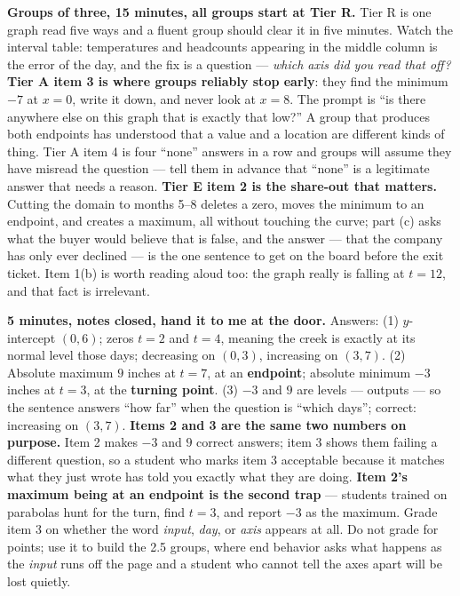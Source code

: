 \documentclass[10pt]{article}
\begin{document}
\boxguard[18]
\begin{teachernote}
    \textbf{Groups of three, 15 minutes, all groups start at Tier R.} Tier R is one graph read five
    ways and a fluent group should clear it in five minutes. Watch the interval table: temperatures
    and headcounts appearing in the middle column is the error of the day, and the fix is a question
    --- \emph{which axis did you read that off?} \textbf{Tier A item 3 is where groups reliably stop
    early}: they find the minimum $-7$ at $x=0$, write it down, and never look at $x=8$. The prompt is
    ``is there anywhere else on this graph that is exactly that low?'' A group that produces both
    endpoints has understood that a value and a location are different kinds of thing. Tier A item 4
    is four ``none'' answers in a row and groups will assume they have misread the question --- tell
    them in advance that ``none'' is a legitimate answer that needs a reason. \textbf{Tier E item 2 is
    the share-out that matters.} Cutting the domain to months 5--8 deletes a zero, moves the minimum to
    an endpoint, and creates a maximum, all without touching the curve; part (c) asks what the buyer
    would believe that is false, and the answer --- that the company has only ever declined --- is the
    one sentence to get on the board before the exit ticket. Item 1(b) is worth reading aloud too: the
    graph really is falling at $t=12$, and that fact is irrelevant.
\end{teachernote}

\boxguard[18]
\begin{teachernote}
    \textbf{5 minutes, notes closed, hand it to me at the door.} Answers: (1) $y$-intercept $(0,6)$;
    zeros $t=2$ and $t=4$, meaning the creek is exactly at its normal level those days; decreasing on
    $(0,3)$, increasing on $(3,7)$. (2) Absolute maximum $9$ inches at $t=7$, at an \textbf{endpoint};
    absolute minimum $-3$ inches at $t=3$, at the \textbf{turning point}. (3) $-3$ and $9$ are levels
    --- outputs --- so the sentence answers ``how far'' when the question is ``which days''; correct:
    increasing on $(3,7)$. \textbf{Items 2 and 3 are the same two numbers on purpose.} Item 2 makes
    $-3$ and $9$ correct answers; item 3 shows them failing a different question, so a student who
    marks item 3 acceptable because it matches what they just wrote has told you exactly what they
    are doing. \textbf{Item 2's maximum being at an endpoint is the second trap} --- students trained
    on parabolas hunt for the turn, find $t=3$, and report $-3$ as the maximum. Grade item 3 on
    whether the word \emph{input}, \emph{day}, or \emph{axis} appears at all. Do not grade for points;
    use it to build the 2.5 groups, where end behavior asks what happens as the \emph{input} runs off
    the page and a student who cannot tell the axes apart will be lost quietly.
\end{teachernote}
\end{document}
